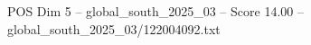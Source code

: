 \begin{textsample}{POS Dim 5 – global\_south\_2025\_03 – Score 14.00 – global\_south\_2025\_03/122004092.txt}
\end{textsample}

